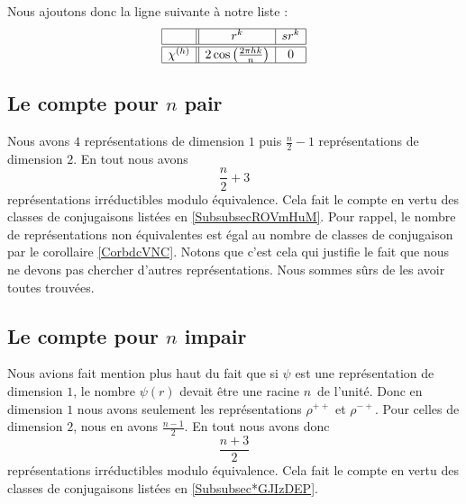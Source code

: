 Nous ajoutons donc la ligne suivante à notre liste :
\begin{equation*}
    \begin{array}[]{|c||c|c|}
        \hline
        &r^k&sr^k\\
        \hline\hline
        \chi^{(h)}&2\cos\left( \frac{ 2\pi hk }{ n } \right)&0\\
        \hline
    \end{array}
\end{equation*}

\subsection{Le compte pour \texorpdfstring{$ n$}{n} pair}

Nous avons \( 4\) représentations de dimension \( 1\) puis \( \frac{ n }{2}-1\) représentations de dimension \( 2\). En tout nous avons 
\begin{equation}
 \frac{ n }{2}+3
\end{equation}
représentations irréductibles modulo équivalence. Cela fait le compte en vertu des classes de conjugaisons listées en \ref{SubsubsecROVmHuM}. Pour rappel, le nombre de représentations non équivalentes est égal au nombre de classes de conjugaison par le corollaire \ref{CorbdcVNC}. Notons que c'est cela qui justifie le fait que nous ne devons pas chercher d'autres représentations. Nous sommes sûrs de les avoir toutes trouvées.

\subsection{Le compte pour \texorpdfstring{$ n$}{n} impair}

Nous avions fait mention plus haut du fait que si \( \psi\) est une représentation de dimension \( 1\), le nombre \( \psi(r)\) devait être une racine \( n\)\ieme\ de l'unité. Donc en dimension \( 1\) nous avons seulement les représentations \( \rho^{++}\) et \( \rho^{-+}\). Pour celles de dimension \( 2\), nous en avons \( \frac{ n-1 }{2}\). En tout nous avons donc
\begin{equation}
    \frac{ n+3 }{2}
\end{equation}
représentations irréductibles modulo équivalence. Cela fait le compte en vertu des classes de conjugaisons listées en \ref{Subsubsec*GJIzDEP}.
